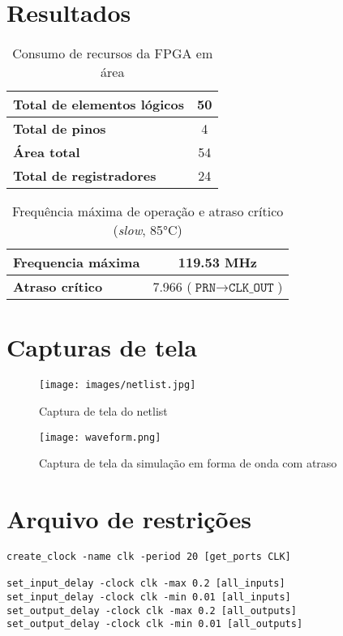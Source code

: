 \documentclass[12pt, fleqn]{article}
\begin{document}
\section{Resultados}

\begin{table}[H]
    \centering
    \begin{tabular}{|l | c|}
        \hline
        \textbf{Total de elementos lógicos} & 50 \\
        \hline
        \textbf{Total de pinos} & 4 \\
        \hline
        \textbf{Área total} & 54 \\
        \hline
        \textbf{Total de registradores} & 24 \\
        \hline
    \end{tabular}
    \caption{Consumo de recursos da FPGA em área}
\end{table}

\begin{table}[H]
    \centering
    \begin{tabular}{|l | c|}
        \hline
        \textbf{Frequencia máxima} & 119.53 MHz \\
        \hline
        \textbf{Atraso crítico} & 7.966 ($\texttt{PRN} \to \texttt{CLK\_OUT}$) \\
        \hline
    \end{tabular}
    \caption{Frequência máxima de operação e atraso crítico (\textit{slow}, 85°C)}
\end{table}

\section{Capturas de tela}

\begin{figure}[H]
    \texttt{[image: images/netlist.jpg]}
    \caption{Captura de tela do netlist}
\end{figure}

\begin{figure}[H]
    \texttt{[image: waveform.png]}
    \caption{Captura de tela da simulação em forma de onda com atraso}
\end{figure}

\section{Arquivo de restrições}

\begin{lstlisting}[caption=constraints.sdc]
create_clock -name clk -period 20 [get_ports CLK]

set_input_delay -clock clk -max 0.2 [all_inputs]
set_input_delay -clock clk -min 0.01 [all_inputs]
set_output_delay -clock clk -max 0.2 [all_outputs]
set_output_delay -clock clk -min 0.01 [all_outputs]  
\end{lstlisting}
\end{document}
